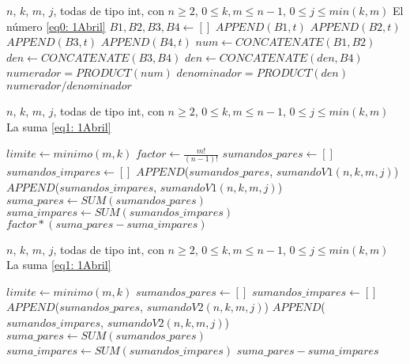 \begin{algorithm}
\caption{$sumandoV2$}\label{alg: sumandoV2}
\begin{algorithmic} [1]
\REQUIRE $n$, $k$, $m$, $j$, todas de tipo int, con $n \geq 2$, 
$0 \leq k, m \leq n-1$, $0 \leq j \leq min(k,m)$
\ENSURE El número \eqref{eq0: 1Abril}
\STATE $B1, B2, B3, B4 \leftarrow []$
\STATE $APPEND(B1, t)$
\ENDFOR
{} 
\STATE $APPEND(B2, t)$
\ENDFOR
{} 
\STATE $APPEND(B3, t)$
\ENDFOR
{} 
\STATE $APPEND(B4, t)$
\ENDFOR
\STATE $num \leftarrow CONCATENATE(B1, B2)$
\STATE $den \leftarrow CONCATENATE(B3, B4)$
\STATE $den \leftarrow CONCATENATE(den, B4)$
\STATE $numerador = PRODUCT(num)$
\STATE $denominador = PRODUCT(den)$
\RETURN $numerador/denominador$
\end{algorithmic}
\end{algorithm}



\begin{algorithm}
\caption{$sumatoriaV1$}\label{alg: sumatoriaV1}
\begin{algorithmic} [1]
\REQUIRE $n$, $k$, $m$, $j$, todas de tipo int, con $n \geq 2$, 
$0 \leq k, m \leq n-1$, $0 \leq j \leq min(k,m)$
\ENSURE La suma \eqref{eq1: 1Abril}

\STATE $limite \leftarrow minimo(m,k)$
\STATE $factor \leftarrow \frac{m!}{(n-1)!}$
\STATE $sumandos\_pares \leftarrow []$
\STATE $sumandos\_impares \leftarrow []$
\STATE $APPEND$($sumandos\_pares$, $sumandoV1(n,k,m,j)$)
\ENDFOR
{} 
\STATE $APPEND$($sumandos\_impares$, $sumandoV1(n,k,m,j)$)
\ENDFOR
\STATE $suma\_pares \leftarrow SUM(sumandos\_pares)$
\STATE $suma\_impares \leftarrow SUM(sumandos\_impares)$
\RETURN $factor * (suma\_pares - suma\_impares)$
\end{algorithmic}
\end{algorithm}

\begin{algorithm}
\caption{$sumatoriaV2$}\label{alg: sumatoriaV2}
\begin{algorithmic} [1]
\REQUIRE $n$, $k$, $m$, $j$, todas de tipo int, con $n \geq 2$, 
$0 \leq k, m \leq n-1$, $0 \leq j \leq min(k,m)$
\ENSURE La suma \eqref{eq1: 1Abril}

\STATE $limite \leftarrow minimo(m,k)$
\STATE $sumandos\_pares \leftarrow []$
\STATE $sumandos\_impares \leftarrow []$
\STATE $APPEND$($sumandos\_pares$, $sumandoV2(n,k,m,j)$)
\ENDFOR
{} 
\STATE $APPEND$($sumandos\_impares$, $sumandoV2(n,k,m,j)$)
\ENDFOR
\STATE $suma\_pares \leftarrow SUM(sumandos\_pares)$
\STATE $suma\_impares \leftarrow SUM(sumandos\_impares)$
\RETURN $suma\_pares - suma\_impares$
\end{algorithmic}
\end{algorithm}


